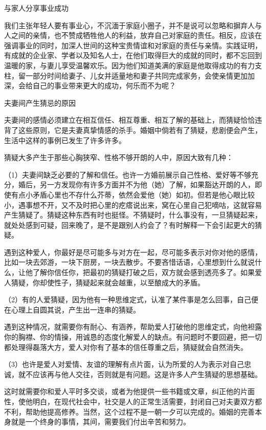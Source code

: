 \documentclass[12pt,UTF8]{ctexbook}
\begin{document}
与家人分享事业成功


我们主张年轻人要有事业心，不沉湎于家庭小圈子，并不是说可以忽略和摒弃人与人之间的亲情，也不赞成牺牲他人的利益，放弃自己对家庭的责任。相反，应该在强调事业的同时，加深人世间的这种宝贵情谊和对家庭的责任与亲情。实践证明，有成就的企业家、学者以及知名人士，在他们取得巨大的成就的同时，都不忘回到温暖的家，与妻儿享受温馨欢乐。因为他们知道美满的家庭是他取得成功的有力支柱，留一部分时间给妻子、儿女并适量地和妻子共同完成家务，会使亲情更加加深，会给自己的事业带来更大的成功，何乐而不为呢？





夫妻间产生猜忌的原因


夫妻间的感情必须建立在相互信任、相互尊重、相互了解的基础上，而猜疑恰恰违背了这些原则，它是夫妻真挚情感的杀手。婚姻中倘若有了猜疑，悲剧便会产生，生活中这样的事例已发生了许多许多。

猜疑大多产生于那些心胸狭窄、性格不够开朗的人中，原因大致有几种：

（1）夫妻间缺乏必要的了解和信任。也许一方婚前展示自己性格、爱好等不够充分，婚后，另一方发现你有许多方面并不为他（她）了解，如果豁达开朗的人，即使有点小矛盾心里也不存什么芥蒂，依然会爱他（她）如初。但若是他心眼比较小，遇事想不开，又不及时把心里的疙瘩说出来，窝在心里自己犯嘀咕，这就容易产生猜疑了。猜疑这种东西有时也挺怪。不猜疑时，什么事没有，一旦猜疑起来，就处处感到可疑，回来晚了，是不是跟别人约会了？有时解释一下会引起更大的猜疑。

遇到这种爱人，你最好是尽可能多与对方在一起，尽可能多表示对你对他的感情，比如一块去郊游，一块下厨房，一块去散步。不要吝惜话语，心里想到什么就说什么，让他了解你信任你，把最初的猜疑打破之后，双方就会感到透亮多了。如果爱人猜疑，你却使性子，猜疑起来就会越重，以至酿成大的矛盾。

（2）有的人爱猜疑，因为他有一种思维定式，认准了某件事是怎么回事，自己便在心理上自圆其说，产生出一连串的猜疑。

遇到这种情况，就需要你有耐心、有涵养，帮助爱人打破他的思维定式，向他袒露你的胸襟、你的情操，用诚恳的态度化解爱人的缺点。有问题时不要回避，把一切都处理得磊落大方，爱人对你有了基本的信任尊重之后，猜疑就会自然消失。

（3）也许是爱人对爱情、友谊的理解有点片面，认为所爱的人为表示对自己忠诚，就不应该再与他人交往，否则就是有问题。这是许多人产生猜疑的思想基础。

这时就需要你和爱人平时多交谈，或者为他提供一些书籍或文章，纠正他的片面性，使他明白，在现代社会中，社交是人的正常生活需要，封闭自己对夫妻双方都不利，帮助他提高修养。当然，这个过程不是一朝一夕可以完成的。婚姻的完善本身就是一个终身的事情，其间，需要我们付出辛苦和努力。
\end{document}
